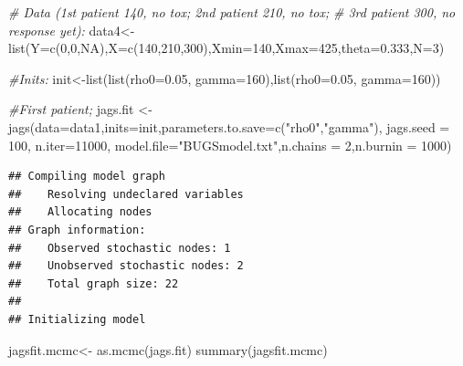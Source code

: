 \documentclass[
]{article}
\newenvironment{Shaded}{\begin{snugshade}}{\end{snugshade}}
\newcommand{\AttributeTok}[1]{\textcolor[rgb]{0.77,0.63,0.00}{#1}}
\newcommand{\CommentTok}[1]{\textcolor[rgb]{0.56,0.35,0.01}{\textit{#1}}}
\newcommand{\ConstantTok}[1]{\textcolor[rgb]{0.00,0.00,0.00}{#1}}
\newcommand{\DecValTok}[1]{\textcolor[rgb]{0.00,0.00,0.81}{#1}}
\newcommand{\FloatTok}[1]{\textcolor[rgb]{0.00,0.00,0.81}{#1}}
\newcommand{\FunctionTok}[1]{\textcolor[rgb]{0.00,0.00,0.00}{#1}}
\newcommand{\NormalTok}[1]{#1}
\newcommand{\OtherTok}[1]{\textcolor[rgb]{0.56,0.35,0.01}{#1}}
\newcommand{\StringTok}[1]{\textcolor[rgb]{0.31,0.60,0.02}{#1}}
\begin{document}
\begin{Shaded}
\begin{Highlighting}[]
\CommentTok{\# Data (1st patient 140, no tox; 2nd patient 210, no tox;}
\CommentTok{\#   3rd patient 300, no response yet):}
\NormalTok{data4}\OtherTok{\textless{}{-}}\FunctionTok{list}\NormalTok{(}\AttributeTok{Y=}\FunctionTok{c}\NormalTok{(}\DecValTok{0}\NormalTok{,}\DecValTok{0}\NormalTok{,}\ConstantTok{NA}\NormalTok{),}\AttributeTok{X=}\FunctionTok{c}\NormalTok{(}\DecValTok{140}\NormalTok{,}\DecValTok{210}\NormalTok{,}\DecValTok{300}\NormalTok{),}\AttributeTok{Xmin=}\DecValTok{140}\NormalTok{,}\AttributeTok{Xmax=}\DecValTok{425}\NormalTok{,}\AttributeTok{theta=}\FloatTok{0.333}\NormalTok{,}\AttributeTok{N=}\DecValTok{3}\NormalTok{) }
    
\CommentTok{\#Inits:}
\NormalTok{init}\OtherTok{\textless{}{-}}\FunctionTok{list}\NormalTok{(}\FunctionTok{list}\NormalTok{(}\AttributeTok{rho0=}\FloatTok{0.05}\NormalTok{, }\AttributeTok{gamma=}\DecValTok{160}\NormalTok{),}\FunctionTok{list}\NormalTok{(}\AttributeTok{rho0=}\FloatTok{0.05}\NormalTok{, }\AttributeTok{gamma=}\DecValTok{160}\NormalTok{))}

\CommentTok{\#First patient;}
\NormalTok{jags.fit }\OtherTok{\textless{}{-}} \FunctionTok{jags}\NormalTok{(}\AttributeTok{data=}\NormalTok{data1,}\AttributeTok{inits=}\NormalTok{init,}\AttributeTok{parameters.to.save=}\FunctionTok{c}\NormalTok{(}\StringTok{"rho0"}\NormalTok{,}\StringTok{"gamma"}\NormalTok{),}
         \AttributeTok{jags.seed =} \DecValTok{100}\NormalTok{, }\AttributeTok{n.iter=}\DecValTok{11000}\NormalTok{, }\AttributeTok{model.file=}\StringTok{"BUGSmodel.txt"}\NormalTok{,}\AttributeTok{n.chains =} \DecValTok{2}\NormalTok{,}\AttributeTok{n.burnin =} \DecValTok{1000}\NormalTok{)}
\end{Highlighting}
\end{Shaded}

\begin{verbatim}
## Compiling model graph
##    Resolving undeclared variables
##    Allocating nodes
## Graph information:
##    Observed stochastic nodes: 1
##    Unobserved stochastic nodes: 2
##    Total graph size: 22
## 
## Initializing model
\end{verbatim}

\begin{Shaded}
\begin{Highlighting}[]
\NormalTok{jagsfit.mcmc}\OtherTok{\textless{}{-}} \FunctionTok{as.mcmc}\NormalTok{(jags.fit)}
\FunctionTok{summary}\NormalTok{(jagsfit.mcmc)}
\end{Highlighting}
\end{Shaded}
\end{document}
